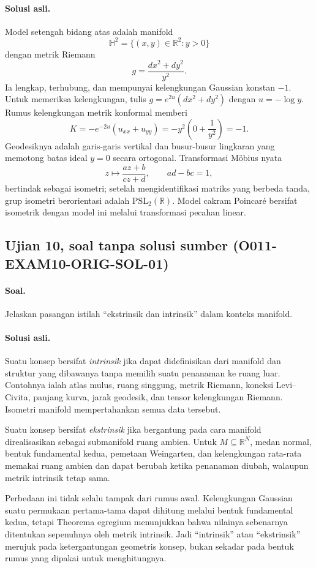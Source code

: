 \paragraph{Solusi asli.}
Model setengah bidang atas adalah manifold
\[
 \mathbb H^2=\{(x,y)\in\mathbb R^2:y>0\}
\]
dengan metrik Riemann
\[
 g=\frac{dx^2+dy^2}{y^2}.
\]
Ia lengkap, terhubung, dan mempunyai kelengkungan Gaussian konstan $-1$.
Untuk memeriksa kelengkungan, tulis $g=e^{2u}(dx^2+dy^2)$ dengan
$u=-\log y$. Rumus kelengkungan metrik konformal memberi
\[
 K=-e^{-2u}(u_{xx}+u_{yy})
 =-y^2\left(0+\frac1{y^2}\right)=-1.
\]
Geodesiknya adalah garis-garis vertikal dan busur-busur lingkaran yang
memotong batas ideal $y=0$ secara ortogonal. Transformasi M\"obius nyata
\[
 z\longmapsto\frac{az+b}{cz+d},
 \qquad ad-bc=1,
\]
bertindak sebagai isometri; setelah mengidentifikasi matriks yang berbeda
tanda, grup isometri berorientasi adalah $\mathrm{PSL}_2(\mathbb R)$. Model
cakram Poincar\'e bersifat isometrik dengan model ini melalui transformasi
pecahan linear.

\subsection*{Ujian 10, soal tanpa solusi sumber (O011-EXAM10-ORIG-SOL-01)}
\label{o011-exam10-orig-sol-01}

\paragraph{Soal.}
Jelaskan pasangan istilah ``ekstrinsik dan intrinsik'' dalam konteks manifold.

\paragraph{Solusi asli.}
Suatu konsep bersifat \emph{intrinsik} jika dapat didefinisikan dari manifold
dan struktur yang dibawanya tanpa memilih suatu penanaman ke ruang luar.
Contohnya ialah atlas mulus, ruang singgung, metrik Riemann, koneksi
Levi--Civita, panjang kurva, jarak geodesik, dan tensor kelengkungan Riemann.
Isometri manifold mempertahankan semua data tersebut.

Suatu konsep bersifat \emph{ekstrinsik} jika bergantung pada cara manifold
direalisasikan sebagai submanifold ruang ambien. Untuk
$M\subseteq\mathbb R^N$, medan normal, bentuk fundamental kedua, pemetaan
Weingarten, dan kelengkungan rata-rata memakai ruang ambien dan dapat berubah
ketika penanaman diubah, walaupun metrik intrinsik tetap sama.

Perbedaan ini tidak selalu tampak dari rumus awal. Kelengkungan Gaussian suatu
permukaan pertama-tama dapat dihitung melalui bentuk fundamental kedua, tetapi
Theorema egregium menunjukkan bahwa nilainya sebenarnya ditentukan sepenuhnya
oleh metrik intrinsik. Jadi ``intrinsik'' atau ``ekstrinsik'' merujuk pada
ketergantungan geometris konsep, bukan sekadar pada bentuk rumus yang dipakai
untuk menghitungnya.
